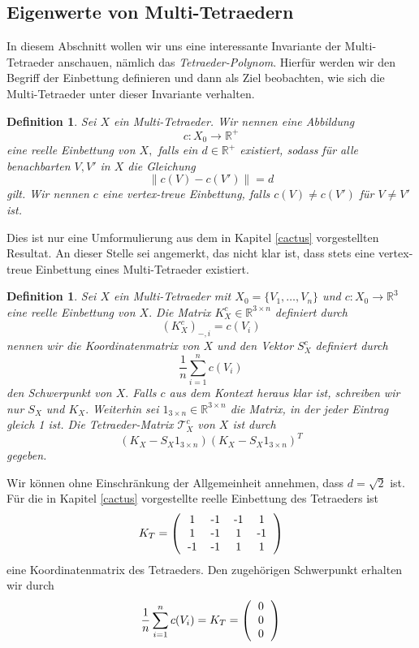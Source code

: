 \documentclass[12pt,titlepage,twoside,cleardoublepage]{article}
\theoremstyle{nummermitklammern}
\newtheorem{definition}[temp]{Definition}
\newtheorem{definition}[zahl]{Definition}
\numberwithin{equation}{section}
\begin{document}
\subsection{Eigenwerte von Multi-Tetraedern}\label{eigenwerte}
In diesem Abschnitt wollen wir uns eine interessante Invariante der Multi-Tetraeder anschauen, nämlich das \emph{Tetraeder-Polynom}. Hierfür werden wir den Begriff der Einbettung definieren und dann als Ziel beobachten, wie sich die Multi-Tetraeder unter dieser Invariante verhalten.
\begin{definition}
Sei $X$ ein Multi-Tetraeder. Wir nennen eine Abbildung 
\[
c:X_0\to \mathbb{R}^+
\]
eine reelle Einbettung von $X,$ falls ein $d\in \mathbb{R}^+$ existiert, sodass für alle benachbarten $V,V'$ in $X$ die Gleichung
\[
\| c(V)-c(V')\|=d
\] 
gilt. Wir nennen $c$ eine vertex-treue Einbettung, falls $c(V)\neq c(V')$ für $V\neq V'$ ist.
\end{definition}
Dies ist nur eine Umformulierung aus dem in Kapitel \ref{cactus} vorgestellten Resultat. An dieser Stelle sei angemerkt, das nicht klar ist, dass stets eine vertex-treue Einbettung eines Multi-Tetraeder existiert.
\begin{definition}
Sei $X$ ein Multi-Tetraeder mit $ X_0=\{V_1,\ldots,V_n\} $ und $c:X_0\to \mathbb{R}^3$ eine reelle Einbettung von $X.$ Die Matrix $K^c_X\in \mathbb{R}^{3\times n}$ definiert durch
\[
(K^c_X)_{-,i}=c(V_i)
\] 
nennen wir die Koordinatenmatrix von $X$ und den Vektor $S^c_X$ definiert durch 
\[
\frac{1}{n}\sum_{i=1}^nc(V_i)
\] den Schwerpunkt von $X.$
Falls $c$ aus dem Kontext heraus klar ist, schreiben wir nur $S_X$ und $K_X.$
Weiterhin sei $1_{3\times n}\in \mathbb{R}^{3\times n}$ die Matrix, in der jeder Eintrag gleich 1 ist. Die \emph{Tetraeder-Matrix} $\mathcal{T}^c_X$ von $X$ ist durch
\[
(K_X-S_X1_{3\times n})(K_X-S_X1_{3\times n})^T
\] 
gegeben. 
\end{definition} 
Wir können ohne Einschränkung der Allgemeinheit annehmen, dass $d=\sqrt{2}$ ist. 
Für die in Kapitel \ref{cactus} vorgestellte reelle  Einbettung des Tetraeders ist
\[
K_T=\left(\begin{tabular}{cccc}
1&-1&-1&1\\
1&-1&1&-1\\
-1&-1&1&1\\
\end{tabular}\right)
\] 
eine Koordinatenmatrix des Tetraeders.
Den zugehörigen Schwerpunkt erhalten wir durch 
\[
\frac{1}{n}\sum_{i=1}^nc(V_i)=
K_T=\left(\begin{tabular}{c}
0\\
0\\
0\\
\end{tabular}\right)
\]
\end{document}
